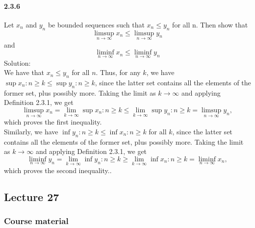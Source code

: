 \documentclass{article}
\begin{document}
\paragraph{2.3.6}
Let ${x_n}$ and ${y_n}$ be bounded sequences such that $x_n \leq y_n$ for all n. Then show that
$$\limsup_{n\to \infty}x_n\leq \limsup_{n\to \infty}y_n$$ and
$$\liminf_{n\to \infty}x_n\leq \liminf_{n\to \infty}y_n$$
Solution:\\
We have that $x_n \leq y_n$ for all $n$. Thus, for any $k$, we have $\sup{x_n : n \geq k} \leq \sup{y_n : n \geq k}$, since the latter set contains all the elements of the former set, plus possibly more. Taking the limit as $k\to\infty$ and applying Definition 2.3.1, we get
$$\limsup_{n\to\infty} x_n = \lim_{k\to\infty}\sup{x_n : n \geq k} \leq \lim_{k\to\infty}\sup{y_n : n \geq k} = \limsup_{n\to\infty} y_n,$$
which proves the first inequality.\\
Similarly, we have $\inf{y_n : n \geq k} \leq \inf{x_n : n \geq k}$ for all $k$, since the latter set contains all the elements of the former set, plus possibly more. Taking the limit as $k\to\infty$ and applying Definition 2.3.1, we get
$$\liminf_{n\to\infty} y_n = \lim_{k\to\infty}\inf{y_n : n \geq k} \geq \lim_{k\to\infty}\inf{x_n : n \geq k} = \liminf_{n\to\infty} x_n,$$
which proves the second inequality..
\subsection{Lecture 27}
\subsubsection{Course material}
\end{document}
